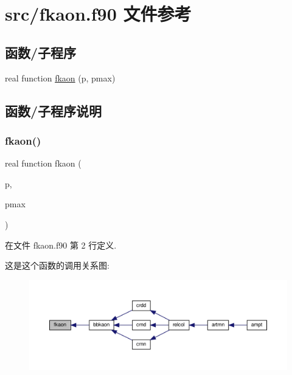 \hypertarget{fkaon_8f90}{}\section{src/fkaon.f90 文件参考}
\label{fkaon_8f90}
\subsection*{函数/子程序}
\begin{DoxyCompactItemize}
\item 
real function \mbox{\hyperlink{fkaon_8f90_acd6c037adb2b742dc5f1465e04985fbb}{fkaon}} (p, pmax)
\end{DoxyCompactItemize}


\subsection{函数/子程序说明}
\mbox{\label{fkaon_8f90_acd6c037adb2b742dc5f1465e04985fbb}} 
\subsubsection{\texorpdfstring{fkaon()}{fkaon()}}
{\footnotesize\ttfamily real function fkaon (\begin{DoxyParamCaption}\item[{}]{p,  }\item[{}]{pmax }\end{DoxyParamCaption})}



在文件 fkaon.\+f90 第 2 行定义.

这是这个函数的调用关系图\+:
\nopagebreak
\begin{figure}[H]
\begin{center}
\leavevmode
\includegraphics[width=350pt]{fkaon_8f90_acd6c037adb2b742dc5f1465e04985fbb_icgraph}
\end{center}
\end{figure}
